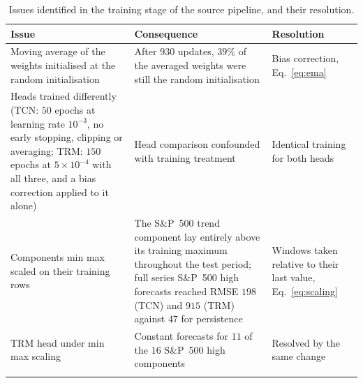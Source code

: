 \begin{table}[ht]
\caption{Issues identified in the training stage of the source pipeline, and their resolution.}
\label{tab:audit_train}
\small
\begin{tabular}{@{}L{0.30\textwidth}L{0.39\textwidth}L{0.23\textwidth}@{}}
\toprule
Issue & Consequence & Resolution \\
\midrule
Moving average of the weights initialised at the random initialisation &
After $930$ updates, $39\%$ of the averaged weights were still the random initialisation &
Bias correction, Eq.~\eqref{eq:ema} \\
Heads trained differently (TCN: $50$ epochs at learning rate $10^{-3}$, no early stopping, clipping or averaging; TRM: $150$ epochs at $5\times10^{-4}$ with all three, and a bias correction applied to it alone) &
Head comparison confounded with training treatment &
Identical training for both heads \\
Components min max scaled on their training rows &
The S\&P~500 trend component lay entirely above its training maximum throughout the test period; full series S\&P~500 high forecasts reached RMSE $198$ (TCN) and $915$ (TRM) against $47$ for persistence &
Windows taken relative to their last value, Eq.~\eqref{eq:scaling} \\
TRM head under min max scaling &
Constant forecasts for $11$ of the $16$ S\&P~500 high components &
Resolved by the same change \\
\botrule
\end{tabular}
\end{table}

